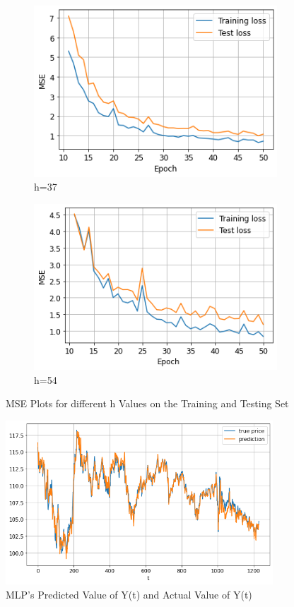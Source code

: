 \documentclass{homework}
\begin{document}
\begin{figure}
\medskip
\begin{subfigure}{0.45\textwidth}
\includegraphics[width=\linewidth]{h37_loss.png}
\caption{h=37}
\end{subfigure}
\hfill 
\begin{subfigure}{0.45\textwidth}
\includegraphics[width=\linewidth]{h54_loss.png}
\caption{h=54}
\end{subfigure}

\caption{MSE Plots for different h Values on the Training and Testing Set} \label{train_test}
\end{figure}

\begin{figure}[h]
    \centering
    \includegraphics[width=10cm]{hw1_predvactual.png}
    \caption{MLP's Predicted Value of Y(t) and Actual Value of Y(t)}
    \label{pred_v_actual}
\end{figure}
\end{document}
